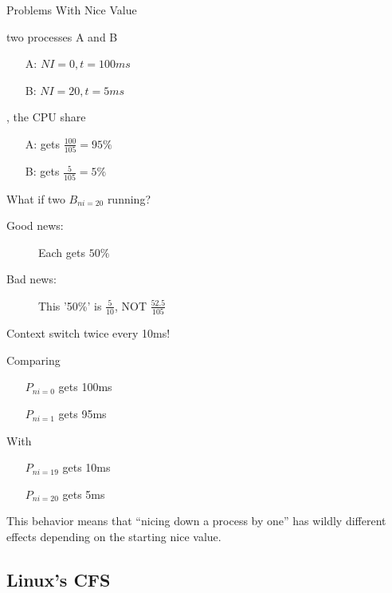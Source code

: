\begin{frame}{Problems With Nice Value}
  \begin{multicols}{2}
     two processes A and B
    \begin{itemize}
    \item[A:] $NI=0, t=100ms$
    \item[B:] $NI=20, t=5ms$
    \end{itemize}\vfill\columnbreak
    , the CPU share
    \begin{itemize}
    \item[A:] gets $\frac{100}{105} = 95\%$
    \item[B:] gets $\frac{5}{105} = 5\%$
    \end{itemize}
  \end{multicols}
  \begin{block}{What if two $B_{ni=20}$ running?}
    \begin{description}
    \item[Good news:] Each gets $50\%$
    \item[Bad news:] This '50\%' is $\frac{5}{10}$, NOT $\frac{52.5}{105}$
    \end{description}
    Context switch twice every 10ms!
  \end{block}
\end{frame}
\clearpage
\begin{frame}
  \begin{multicols}{2}
    Comparing
    \begin{itemize}
    \item[] $P_{ni=0}$ gets 100ms
    \item[] $P_{ni=1}$ gets 95ms
    \end{itemize}\vfill\columnbreak
    With
    \begin{itemize}
    \item[] $P_{ni=19}$ gets 10ms
    \item[] $P_{ni=20}$ gets 5ms
    \end{itemize}
  \end{multicols}
  This behavior means that ``nicing down a process by one'' has wildly different effects
  depending on the starting nice value.
\end{frame}

\subsection{Linux's CFS}
\label{sec:linuxs-cfs}

